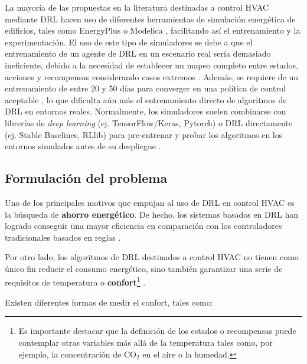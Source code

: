 La mayoría de las propuestas en la literatura destinadas a control HVAC mediante DRL hacen uso de diferentes herramientas de simulación energética de edificios, tales como EnergyPlus \cite{wetter2019ibpsa} o Modelica \cite{bucsoniu2018reinforcement}, facilitando así el entrenamiento y la experimentación. El uso de este tipo de simuladores se debe a que el entrenamiento de un agente de DRL en un escenario real sería demasiado ineficiente, debido a la necesidad de establecer un mapeo completo entre estados, acciones y recompensas considerando casos extremos \cite{brandi2020deep}. Además, se requiere de un entrenamiento de entre 20 y 50 días para converger en una política de control aceptable \cite{fazenda2014using, costanzo2016experimental, vazquez2019fusing}, lo que dificulta aún más el entrenamiento directo de algoritmos de DRL en entornos reales. Normalmente, los simuladores suelen combinarse con librerías de \textit{deep learning} (ej. TensorFlow/Keras, Pytorch) o DRL directamente (ej. Stable Baselines, RLlib) para pre-entrenar y probar los algoritmos en los entornos simulados antes de su despliegue \cite{wang2017long, valladares2019energy}.

\subsection{Formulación del problema}
\label{sec:formulacion}

Uno de los principales motivos que empujan al uso de DRL en control HVAC es la búsqueda de \textbf{ahorro energético}. De hecho, los sistemas basados en DRL han logrado conseguir una mayor eficiencia en comparación con los controladores tradicionales basados en reglas \cite{brandi2020deep, zhang2019whole, zhang2018deep, vazquez2019fusing, vazquez2017balancing}.

Por otro lado, los algoritmos de DRL destinados a control HVAC no tienen como único fin reducir el consumo energético, sino también garantizar una serie de requisitos de temperatura o \textbf{confort}\footnote{Es importante destacar que la definición de los estados o recompensas puede contemplar otras variables más allá de la temperatura tales como, por ejemplo, la concentración de CO$_2$ en el aire o la humedad.} \cite{wei2017deep, fazenda2014using, dalamagkidis2007reinforcement}.

Existen diferentes formas de medir el confort, tales como:

